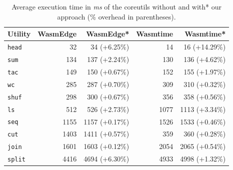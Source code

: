 \begin{table}[!t]
	\centering
	\setlength{\tabcolsep}{0.38cm}
	\begin{tabular*}{0.83\columnwidth}{l r r r r}
		\toprule
		{\bf Utility} & {\bf WasmEdge} & {\bf WasmEdge*} & {\bf Wasmtime} & {\bf Wasmtime*}\\
		\midrule
		{\tt head}  &   32 &   34 (+6.25\%) &   14 &   16 (+14.29\%) \\
		{\tt sum}   &  134 &  137 (+2.24\%) &  130 &  136  (+4.62\%) \\
		{\tt tac}   &  149 &  150 (+0.67\%) &  152 &  155  (+1.97\%) \\
		{\tt wc}    &  285 &  287 (+0.70\%) &  309 &  310  (+0.32\%) \\
		{\tt shuf}  &  298 &  300 (+0.67\%) &  356 &  358  (+0.56\%) \\
		{\tt ls}    &  512 &  526 (+2.73\%) & 1077 & 1113  (+3.34\%) \\
		{\tt seq}   & 1155 & 1157 (+0.17\%) & 1526 & 1533  (+0.46\%) \\
		{\tt cut}   & 1403 & 1411 (+0.57\%) &  359 &  360  (+0.28\%) \\
		{\tt join}  & 1601 & 1603 (+0.12\%) & 2054 & 2065  (+0.54\%) \\
		{\tt split} & 4416 & 4694 (+6.30\%) & 4933 & 4998  (+1.32\%) \\
		\bottomrule
	\end{tabular*}
	\caption[Average execution time of coreutils with and without our approach]{
		\label{table:exp} Average execution time in {\em ms} of the
		coreutils without and with* our approach (\% overhead in
		parentheses).
	}
\end{table}
